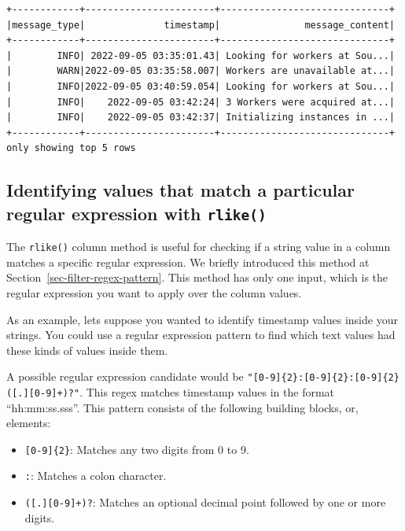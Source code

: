 \documentclass[
  11pt,
  letterpaper,
  DIV=11,
  numbers=noendperiod]{scrreprt}
\providecommand{\tightlist}{%
  \setlength{\itemsep}{0pt}\setlength{\parskip}{0pt}}\usepackage{longtable,booktabs,array}
\begin{document}
\begin{verbatim}
+------------+-----------------------+------------------------------+
|message_type|              timestamp|               message_content|
+------------+-----------------------+------------------------------+
|        INFO| 2022-09-05 03:35:01.43| Looking for workers at Sou...|
|        WARN|2022-09-05 03:35:58.007| Workers are unavailable at...|
|        INFO|2022-09-05 03:40:59.054| Looking for workers at Sou...|
|        INFO|    2022-09-05 03:42:24| 3 Workers were acquired at...|
|        INFO|    2022-09-05 03:42:37| Initializing instances in ...|
+------------+-----------------------+------------------------------+
only showing top 5 rows
\end{verbatim}

\hypertarget{identifying-values-that-match-a-particular-regular-expression-with-rlike}{%
\subsection{\texorpdfstring{Identifying values that match a particular
regular expression with
\texttt{rlike()}}{Identifying values that match a particular regular expression with rlike()}}\label{identifying-values-that-match-a-particular-regular-expression-with-rlike}}

The \texttt{rlike()} column method is useful for checking if a string
value in a column matches a specific regular expression. We briefly
introduced this method at Section~\ref{sec-filter-regex-pattern}. This
method has only one input, which is the regular expression you want to
apply over the column values.

As an example, lets suppose you wanted to identify timestamp values
inside your strings. You could use a regular expression pattern to find
which text values had these kinds of values inside them.

A possible regular expression candidate would be
\texttt{"{[}0-9{]}\{2\}:{[}0-9{]}\{2\}:{[}0-9{]}\{2\}({[}.{]}{[}0-9{]}+)?"}.
This regex matches timestamp values in the format ``hh:mm:ss.sss''. This
pattern consists of the following building blocks, or, elements:

\begin{itemize}
\tightlist
\item
  \texttt{{[}0-9{]}\{2\}}: Matches any two digits from 0 to 9.
\item
  \texttt{:}: Matches a colon character.
\item
  \texttt{({[}.{]}{[}0-9{]}+)?}: Matches an optional decimal point
  followed by one or more digits.
\end{itemize}
\end{document}
